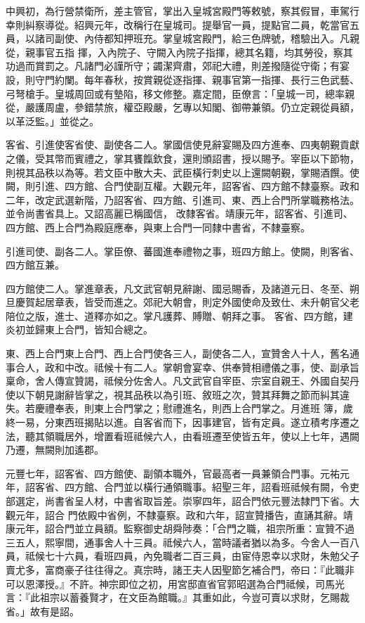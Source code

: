 \begin{pinyinscope}
 中興初，為行營禁衛所，差主管官，掌出入皇城宮殿門等敕號，察其假冒，車駕行幸則糾察導從。紹興元年，改稱行在皇城司。提舉官一員，提點官二員，乾當官五員，以諸司副使、內侍都知押班充。掌皇城宮殿門，給三色牌號，稽驗出入。凡親從，親事官五指
 揮，入內院子、守闕入內院子指揮，總其名籍，均其勞役，察其功過而賞罰之。凡諸門必謹所守；蠲潔齊肅，郊祀大禮，則差撥隨從守衛；有宴設，則守門約闌。每年春秋，按賞親從逐指揮、親事官第一指揮、長行三色武藝、弓弩槍手。皇城周回或有墊陷，移文修整。嘉定間，臣僚言：「皇城一司，總率親從，嚴護周盧，參錯禁旅，權亞殿嚴，乞專以知閣、御帶兼領。仍立定親從員額，以革泛監。」並從之。



 客省、引進使客省使、副使各二人。掌國信使見辭宴賜及四方進奉、四夷朝覲貢獻之儀，受其幣而賓禮之，掌其饔餼欽食，還則頒詔書，授以賜予。宰臣以下節物，則視其品秩以為等。若文臣中散大夫、武臣橫行刺史以上還闕朝覲，掌賜酒饌。使闕，則引進、四方館、合門使副互權。大觀元年，詔客省、四方館不隸臺察。政和二年，改定武選新階，乃詔客省、四方館、引進司、東、西上合門所掌職務格法。並令尚書省具上。又詔高麗已稱國信，
 改隸客省。靖康元年，詔客省、引進司、四方館、西上合門為殿庭應奉，與東上合門一同隸中書省，不隸臺察。



 引進司使、副各二人。掌臣僚、蕃國進奉禮物之事，班四方館上。使闕，則客省、四方館互兼。



 四方館使二人。掌進章表，凡文武官朝見辭謝、國忌賜香，及諸道元日、冬至、朔旦慶賀起居章表，皆受而進之。郊祀大朝會，則定外國使命及致仕、未升朝官父老陪位之版，進士、道釋亦如之。掌凡護葬、賻贈、朝拜之事。
 客省、四方館，建炎初並歸東上合門，皆知合總之。



 東、西上合門東上合門、西上合門使各三人，副使各二人，宣贊舍人十人，舊名通事合人，政和中改。祗候十有二人。掌朝會宴幸、供奉贊相禮儀之事，使、副承旨稟命，舍人傳宣贊謁，祗候分佐舍人。凡文武官自宰臣、宗室自親王、外國自契丹使以下朝見謝辭皆掌之，視其品秩以為引班、敘班之次，贊其拜舞之節而糾其違失。若慶禮奉表，則東上合門掌之；慰禮進名，則西上合門掌之。月進班
 簿，歲終一易，分東西班揭貼以進。自客省而下，因事建官，皆有定員。遂立積考序遷之法，聽其領職居外，增置看班祗候六人，由看班遷至使皆五年，使以上七年，遇闕乃遷，無闕則加遙郡。



 元豐七年，詔客省、四方館使、副領本職外，官最高者一員兼領合門事。元祐元年，詔客省、四方館、合門並以橫行通領職事。紹聖三年，詔看班祗候有闕，令吏部選定，尚書省呈人材，中書省取旨差。崇寧四年，詔合門依元豐法隸門下省。大觀元年，詔合
 門依殿中省例，不隸臺察。政和六年，詔宣贊播告，直誦其辭。靖康元年，詔合門並立員額。監察御史胡舜陟奏：「合門之職，祖宗所重：宣贊不過三五人，熙寧間，通事舍人十三員。祗候六人，當時議者猶以為多。今舍人一百八員，祗候七十六員，看班四員，內免職者二百三員，由宦侍恩幸以求財，朱勉父子賣尤多，富商豪子往往得之。真宗時，諸王夫人因聖節乞補合門，帝曰：『此職非可以恩澤授。』不許。神宗即位之初，用宮邸直省官郭昭選為合門祗候，司馬光言：『此祖宗以蓄養賢才，在文臣為館職。』其重如此，今豈可賣以求財，乞賜裁省。」故有是詔。




\end{pinyinscope}
